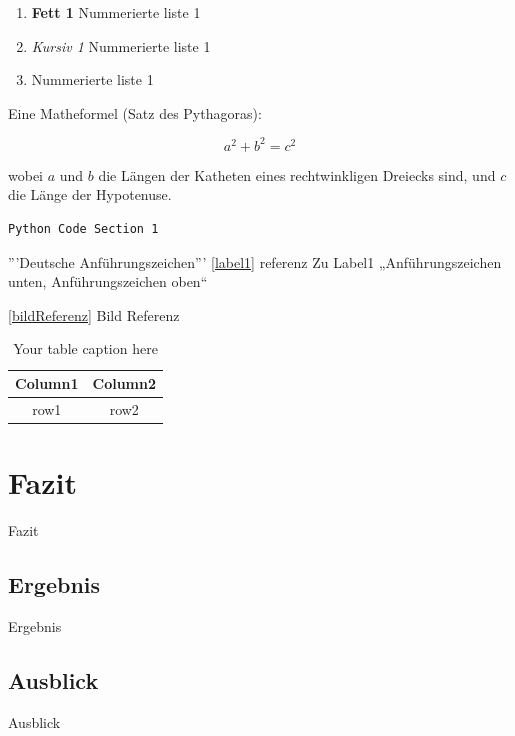 \begin{enumerate}
    \item \textbf{Fett 1} Nummerierte liste 1
    \item \textit{Kursiv 1} Nummerierte liste 1
    \item Nummerierte liste 1
\end{enumerate}


Eine Matheformel (Satz des Pythagoras):

\[
a^2 + b^2 = c^2
\]

wobei \(a\) und \(b\) die Längen der Katheten eines rechtwinkligen Dreiecks sind, und \(c\) die Länge der Hypotenuse.



\begin{lstlisting}[caption={Pip Update}, label={lst:upgradePip}]
    Python Code Section 1
\end{lstlisting}


'''Deutsche Anführungszeichen''' \ref{label1} referenz Zu Label1 
„Anführungszeichen unten, Anführungszeichen oben“

\ref{bildReferenz} Bild Referenz

\begin{table}[h]
    \centering
    \begin{tabular}{|c|c|}
    \hline
        \textbf{Column1} & \textbf{Column2} \\ \hline
        row1 & row2 \\ \hline
    \end{tabular}
    \caption{Your table caption here}
    \label{table:1}
\end{table}

\newpage
\section{Fazit}
Fazit
\subsection{Ergebnis}
Ergebnis

\subsection{Ausblick}
Ausblick

\newpage
